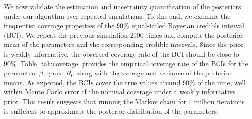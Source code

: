 \documentclass[11pt]{article}
\begin{document}
	We now validate the estimation and uncertainty quantification of the posteriors under our algorithm over repeated simulations. To this end, we examine the frequentist coverage properties of the $90\%$ equal-tailed Bayesian credible interval (BCI). We repeat the previous simulation $2000$ times and compute the posterior mean of the parameters and the corresponding credible intervals. Since the prior is weakly informative, the observed coverage rate of the BCI should be close to $90\%$.
	Table \ref{tab:coverage} provides the empirical coverage rate of the BCIs for the parameters $\beta$, $\gamma$ and $R_0$ along with the average and variance of the posterior means. As expected, the BCIs cover the true values around $90\%$ of the time, well within Monte Carlo error of the nominal coverage under a weakly informative prior. This result suggests that running the Markov chain for $1$ million iterations is sufficient to approximate the posterior distribution of the parameters.
	
\end{document}

